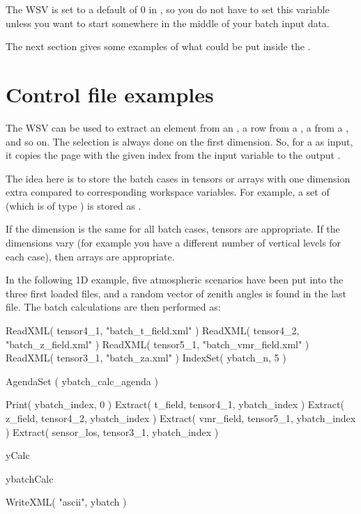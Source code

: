 The WSV  is set to a default of 0 in
, so you do not have to set this variable
unless you want to start somewhere in the middle of your batch input
data. 

The next section gives some examples of what could be put inside
the .

\section{Control file examples}
%
The WSV  can be used to extract an element from an
, a row from a , a
 from a , and so on. The
selection is always done on the first dimension. So, for a
 as input, it copies the page with the given index
from the input  variable to the output
.

The idea here is to store the batch cases in tensors or arrays with
one dimension extra compared to corresponding workspace variables. For
example, a set of  (which is of type
) is stored as .

If the dimension is the same for all batch cases, tensors are
appropriate. If the dimensions vary (for example you have a different
number of vertical levels for each case), then arrays are appropriate.

In the following 1D example, five atmospheric scenarios
have been put into the three first loaded files, and a random vector
of zenith angles is found in the last file. The batch calculations
are then performed as:

\begin{code}
ReadXML( tensor4_1, "batch_t_field.xml" )
ReadXML( tensor4_2, "batch_z_field.xml" )
ReadXML( tensor5_1, "batch_vmr_field.xml" )
ReadXML( tensor3_1, "batch_za.xml" )
IndexSet( ybatch_n, 5 )

AgendaSet ( ybatch_calc_agenda ){
  Print( ybatch_index, 0 )
  Extract( t_field,    tensor4_1, ybatch_index )
  Extract( z_field,    tensor4_2, ybatch_index )
  Extract( vmr_field,  tensor5_1, ybatch_index )
  Extract( sensor_los, tensor3_1, ybatch_index )

  yCalc
}

ybatchCalc

WriteXML( "ascii", ybatch )
\end{code}

